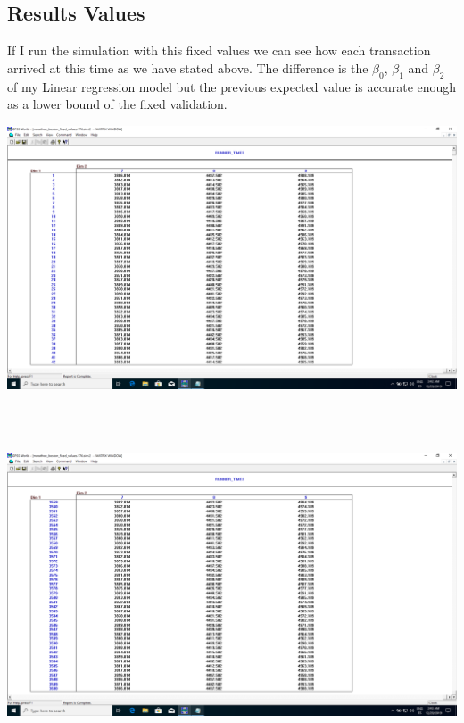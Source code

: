\documentclass[12pt, a4paper]{article}
\begin{document}
\subsection{Results Values}
If I run the simulation with this fixed values we can see how each transaction
arrived at this time as we have stated above. The difference is the $\beta_0$,
$\beta_1$ and $\beta_2$ of my Linear regression model but the previous expected
value is accurate enough as a lower bound of the fixed validation.

\begin{minipage}[t]{\linewidth}
  \centering
  \includegraphics[width=\textwidth]{fixed_values_1}
\end{minipage}\\\\

\begin{minipage}[t]{\linewidth}
  \centering
  \includegraphics[width=\textwidth]{fixed_values_2}
\end{minipage}\\\\
\end{document}
